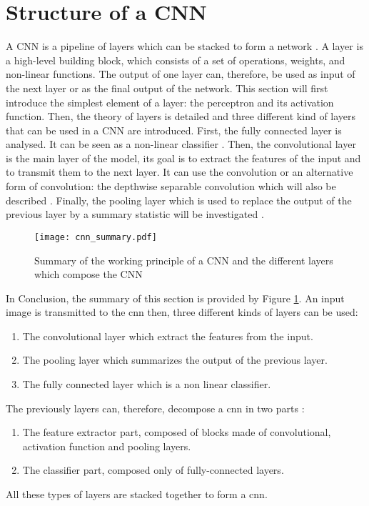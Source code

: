 \section{Structure of a CNN} \label{sec:layer}
A CNN is a pipeline of layers which can be stacked to form a network \cite{abdelouahab_accelerating_2018}. A layer is a high-level building block, which consists of a set of operations, weights, and non-linear functions. The output of one layer can, therefore, be used as input of the next layer or as the final output of the network. This section will first introduce the simplest element of a layer: the perceptron and its activation function. Then, the theory of layers is detailed and three different kind of layers that can be used in a CNN are introduced.
First, the fully connected layer is analysed. It can be seen as a non-linear classifier \cite{khan_survey_2020}. Then, the convolutional layer is the main layer of the model, its goal is to extract the features of the input and to transmit them to the next layer. It can use the convolution or an alternative form of convolution: the depthwise separable convolution which will also be described \cite{liu_fpga-based_2019}. Finally, the pooling layer which is used to replace the output of the previous layer by a summary statistic will be investigated \cite{goodfellow_deep_2016}.
%
%

%

%

%

%

%


\begin{figure}
    \centering
    \texttt{[image: cnn\_summary.pdf]}
    \caption{Summary of the working principle of a CNN and the different layers which compose the CNN}
    \label{fig:layer:summary}
\end{figure}
%
In Conclusion, the summary of this section is provided by Figure \ref{fig:layer:summary}. An input image is transmitted to the \acrshort{cnn} then, three different kinds of layers can be used:
%
\begin{enumerate}
    \item The convolutional layer which extract the features from the input.
    \item The pooling layer which summarizes the output of the previous layer.
    \item The fully connected layer which is a non linear classifier.
\end{enumerate}
%
The previously layers can, therefore, decompose a \acrshort{cnn} in two parts \cite{matteucci_artificial_2019}:
\begin{enumerate}
    \item The feature extractor part, composed of blocks made of convolutional, activation function and pooling layers.
    \item The classifier part, composed only of fully-connected layers.
\end{enumerate}
%
All these types of layers are stacked together to form a \acrshort{cnn}.
%

